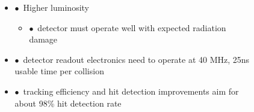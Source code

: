 \documentclass[aspectratio=1610, 12pt]{beamer}
\begin{document}
\begin{frame}
\begin{columns}
\begin{column}[c]{0.48\textwidth}
\begin{figure}
      \end{figure}
    \end{column}
    \begin{column}[c]{0.48\textwidth}
      \begin{itemize}
        \item $\bullet$\, Higher luminosity
        \begin{itemize}
          \item $\bullet$\, detector must operate well with expected radiation damage
        \end{itemize}
        \item $\bullet$\, detector readout electronics need to operate at 40 MHz, 25ns usable time per collision
        \item $\bullet$\, tracking efficiency and hit detection improvements aim for about 98\% hit detection rate
      \end{itemize}
    \end{column}
  \end{columns}
\end{frame}
\end{document}
